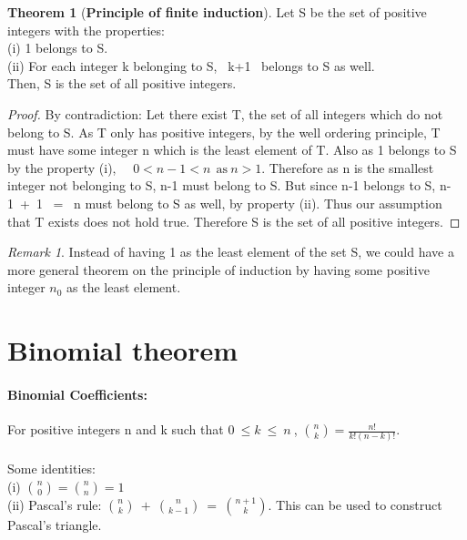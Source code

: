 \documentclass[15,a4paper]{report}
\theoremstyle{definition}
\newtheorem{theorem}{Theorem}[section]
\theoremstyle{remark}
\newtheorem*{remark}{Remark}
\begin{document}
\begin{theorem}[\textbf{Principle of finite induction}]
    Let S be the set of positive integers with the properties:\\
    (i) 1 belongs to S.\\
    (ii) For each integer k belonging to S, ~k+1~ belongs to S as well.\\
    Then, S is the set of all positive integers.
\end{theorem}
\begin{proof}
    By contradiction: Let there exist T, the set of all integers which do not belong to S. As T only has positive integers, by the well ordering principle, T must have some integer n which is the least element of T. Also as 1 belongs to S by the property (i), ~~$0 < n-1 < n ~~\textrm{as} ~ n > 1$. Therefore as n is the smallest integer not belonging to S, n-1 must belong to S. But since n-1 belongs to S, n-1~+~1~ = ~n must belong to S as well, by property (ii). Thus our assumption that T exists does not hold true. Therefore S is the set of all positive integers.
\end{proof}
\begin{remark}
    Instead of having 1 as the least element of the set S, we could have a more general theorem on the principle of induction by having some positive integer $n_0$ as the least element. 
\end{remark}




\section{Binomial theorem}

\paragraph{Binomial Coefficients:} For positive integers n and k such that $0~ \leq k ~\leq~ n ~$, $\binom{n}{k} = \frac{n!}{k!(n-k)!}$.

\paragraph{} Some identities:\\
(i) $\binom{n}{0} = \binom{n}{n} =1$\\
(ii) Pascal's rule:  $\binom{n}{k} ~ + ~ \binom{n}{k-1} ~ = ~ \binom{n+1}{k}$. This can be used to construct Pascal's triangle.
\end{document}
